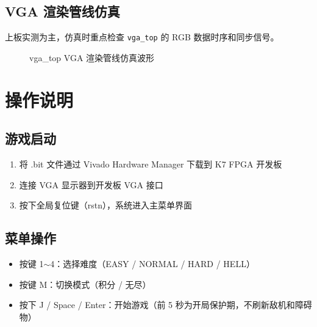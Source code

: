 \documentclass[12pt,a4paper]{ctexart}
\begin{document}
\subsection{VGA 渲染管线仿真}

上板实测为主，仿真时重点检查 \texttt{vga\_top} 的 RGB 数据时序和同步信号。

\begin{figure}[H]
\centering
\caption{vga\_top VGA 渲染管线仿真波形}
\label{fig:sim_vga}
\end{figure}


\section{操作说明}

\subsection{游戏启动}
\begin{enumerate}[label=(\arabic*)]
    \item 将 .bit 文件通过 Vivado Hardware Manager 下载到 K7 FPGA 开发板
    \item 连接 VGA 显示器到开发板 VGA 接口
    \item 按下全局复位键（rstn），系统进入主菜单界面
\end{enumerate}

\subsection{菜单操作}
\begin{itemize}
    \item 按键 1$\sim$4：选择难度（EASY / NORMAL / HARD / HELL）
    \item 按键 M：切换模式（积分 / 无尽）
    \item 按下 J / Space / Enter：开始游戏（前 5 秒为开局保护期，不刷新敌机和障碍物）
\end{itemize}
\end{document}

